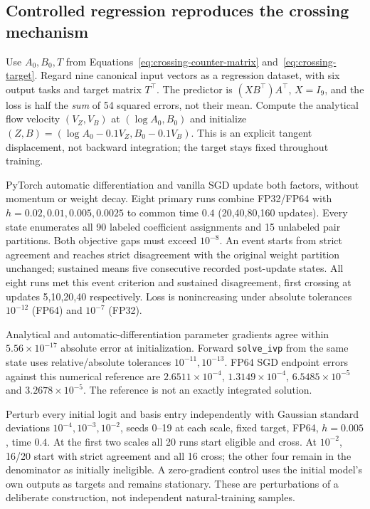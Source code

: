 \subsection{Controlled regression reproduces the crossing mechanism}

Use $A_0,B_0,T$ from Equations~\eqref{eq:crossing-counter-matrix}
and~\eqref{eq:crossing-target}. Regard nine canonical input vectors as
a regression dataset, with six output tasks and target matrix $T^\top$.
The predictor is $(XB^\top)A^\top$, $X=I_9$, and the loss is half the
\emph{sum} of 54 squared errors, not their mean. Compute the analytical
flow velocity $(V_Z,V_B)$ at $(\log A_0,B_0)$ and initialize
$(Z,B)=(\log A_0-0.1V_Z,B_0-0.1V_B)$.
This is an explicit tangent displacement, not backward integration;
the target stays fixed throughout training.

PyTorch automatic differentiation and vanilla SGD update both factors,
without momentum or weight decay. Eight primary runs combine FP32/FP64
with $h=0.02,0.01,0.005,0.0025$ to common time $0.4$
(20,40,80,160 updates). Every state enumerates all 90 labeled coefficient
assignments and 15 unlabeled pair partitions. Both objective gaps must
exceed $10^{-8}$. An event starts from strict agreement and reaches strict
disagreement with the original weight partition unchanged; sustained means
five consecutive recorded post-update states. All eight runs met this event criterion and sustained disagreement,
first crossing at updates 5,10,20,40 respectively. Loss is
nonincreasing under absolute tolerances $10^{-12}$ (FP64) and $10^{-7}$
(FP32).

Analytical and automatic-differentiation parameter gradients agree within
$5.56\times10^{-17}$ absolute error at initialization. Forward
\texttt{solve\_ivp} from the same state uses relative/absolute tolerances
$10^{-11},10^{-13}$. FP64 SGD endpoint errors against this numerical
reference are $2.6511\times10^{-4}$, $1.3149\times10^{-4}$,
$6.5485\times10^{-5}$ and $3.2678\times10^{-5}$. The reference is not
an exactly integrated solution.

Perturb every initial logit and basis entry independently with Gaussian
standard deviations $10^{-4},10^{-3},10^{-2}$, seeds 0--19 at each scale,
fixed target, FP64, $h=0.005$, time $0.4$. At the first two scales all
20 runs start eligible and cross. At $10^{-2}$, 16/20 start with strict
agreement and all 16 cross; the other four remain in the denominator as
initially ineligible. A zero-gradient control uses the initial model's own
outputs as targets and remains stationary. These are perturbations of a
deliberate construction, not independent natural-training samples.

